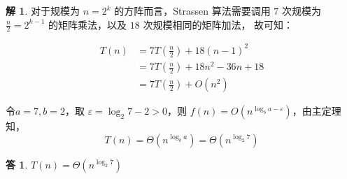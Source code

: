 \documentclass[12pt,a4paper]{ctexart}
\theoremstyle{definition}
\newtheorem*{solution}{解}
\newtheorem*{answer}{答}
\begin{document}
\vspace{5pt}
\noindent
\begin{solution}
    对于规模为 $n = 2^k$ 的方阵而言，Strassen 算法需要调用 $7$ 次规模为 $\frac{n}{2} = 2^{k-1}$ 的矩阵乘法，以及 $18$ 次规模相同的矩阵加法，
    故可知：

    \begin{align*}
        T(n) &= 7T(\frac{n}{2})+18(n-1)^2 \\
        &= 7T(\frac{n}{2})+18n^2-36n+18 \\
        &= 7T(\frac{n}{2})+O(n^2)
    \end{align*}

    令$a = 7, b = 2$，取 $\varepsilon = \log_2 7 - 2 > 0$，则 $f(n) = O(n^{\log_b a - \varepsilon})$，由主定理知，
    \[
        T(n) = \Theta(n^{\log_b a}) = \Theta(n^{\log_2 7})
    \]
\end{solution}
\begin{answer}
        $T(n) = \Theta(n^{\log_2 7})$
\end{answer}

\end{document}
